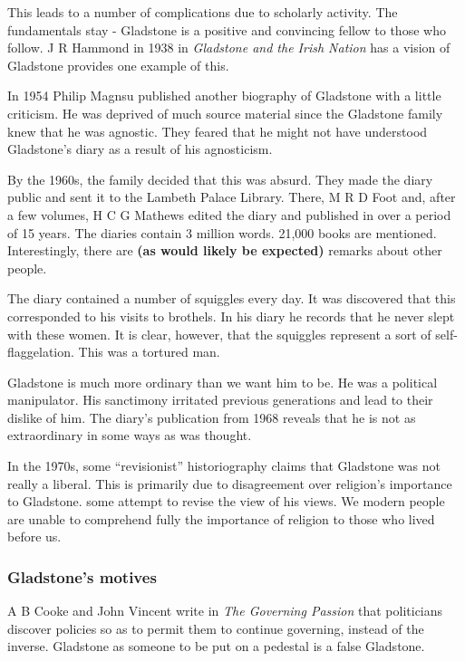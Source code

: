 		This leads to a number of complications due to scholarly activity. The fundamentals stay - Gladstone is a positive and convincing fellow to those who follow. J R Hammond in 1938 in \textit{Gladstone and the Irish Nation} has a vision of Gladstone provides one example of this.

		In 1954 Philip Magnsu published another biography of Gladstone with a little criticism. He was deprived of much source material since the Gladstone family knew that he was agnostic. They feared that he might not have understood Gladstone's diary as a result of his agnosticism.

		By the 1960s, the family decided that this was absurd. They made the diary public and sent it to the Lambeth Palace Library. There, M R D Foot and, after a few volumes, H C G Mathews edited the diary and published in over a period of 15 years. The diaries contain 3 million words. 21,000 books are mentioned. Interestingly, there are \textbf{(as would likely be expected)} remarks about other people.

		The diary contained a number of squiggles every day. It was discovered that this corresponded to his visits to brothels. In his diary he records that he never slept with these women. It is clear, however, that the squiggles represent a sort of self-flaggelation. This was a tortured man.

		Gladstone is much more ordinary than we want him to be. He was a political manipulator. His sanctimony irritated previous generations and lead to their dislike of him. The diary's publication from 1968 reveals that he is not as extraordinary in some ways as was thought.

		In the 1970s, some ``revisionist'' historiography claims that Gladstone was not really a liberal. This is primarily due to disagreement over religion's importance to Gladstone. some attempt to revise the view of his views. We modern people are unable to comprehend fully the importance of religion to those who lived before us.

		\subsubsection{Gladstone's motives}

		A B Cooke and John Vincent write in \textit{The Governing Passion} that politicians discover policies so as to permit them to continue governing, instead of the inverse. Gladstone as someone to be put on a pedestal is a false Gladstone.

